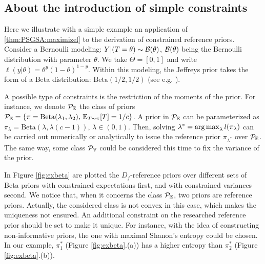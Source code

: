

\subsection{About the introduction of simple constraints}


Here we illustrate with a simple example an application of \cref{thm:PSGSA:maximizel} to the derivation of constrained reference priors.
Consider a Bernoulli modeling: $Y|(T=\theta)\sim\mathcal{B}(\theta)$, $\mathcal{B}(\theta)$ being the Bernoulli distribution with parameter $\theta$. We take $\Theta=[0,1]$ and write $\ell(y|\theta)=\theta^{y}(1-\theta)^{1-y}$.
%
Within this modeling, the Jeffreys prior takes the form of a Beta distribution: $\mathrm{Beta}(1/2,1/2)$ (see e.g. \cite{robert_bayesian_2007}).


A possible type of constraints is the restriction of the moments of the prior. For instance,
we denote $\mathcal{P}_{\mathbb{E}}$ the class of priors $\mathcal{P}_{\mathbb{E}}=\{\pi=\mathrm{Beta}(\lambda_1,\lambda_2),\,\mathbb{E}_{T\sim\pi}[T]=1/c\}$. A prior in $\mathcal{P}_{\mathbb{E}}$ can be parameterized as $\pi_\lambda = \mathrm{Beta}(\lambda,\lambda(c-1))$, $\lambda\in(0,1)$.
Then, %
solving $\lambda^\ast=\operatorname*{arg\,max}_\lambda l(\pi_\lambda)$ can be carried out numerically or analytically to issue the reference prior $\pi_{\lambda^\ast}$ over $\mathcal{P}_{\mathbb{E}}$.
The same way, some class $\mathcal{P}_{\mathbb{V}}$ could be considered this time to fix the variance of the prior.

In Figure \ref{fig:exbeta} are plotted the $D_f$-reference priors over different sets of Beta priors with constrained expectations first, and with constrained variances second. We notice that, when it concerns the class $\mathcal{P}_{\mathbb{E}}$, two priors are reference priors. Actually, the considered class is not convex in this case, which makes the uniqueness not ensured. An additional constraint on the researched reference prior should be set to make it unique. For instance, with the idea of constructing non-informative priors, the one with maximal Shanon's entropy could be chosen. In our example, $\pi_1^\ast$ (Figure \ref{fig:exbeta}.(a)) has a higher entropy than $\pi_2^\ast$ (Figure \ref{fig:exbeta}.(b)).



